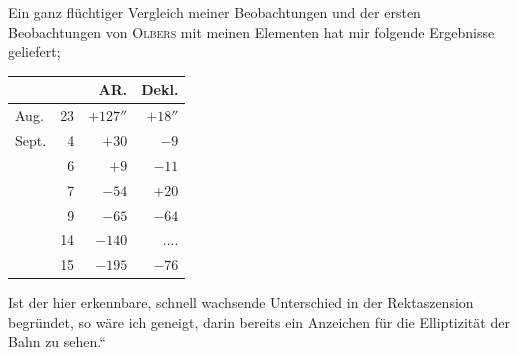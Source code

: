 \par\indent Ein ganz flüchtiger Vergleich meiner Beobachtungen und der ersten Beobachtungen von \textsc{Olbers} mit meinen Elementen hat mir folgende Ergebnisse geliefert;
\begin{center}\fontsize{10}{12}\selectfont\setlength{\tabcolsep}{7pt}\renewcommand{\arraystretch}{1.15}\begin{tabular}{lr|r|r}
 & & AR. & Dekl.\\\hline
Aug. & 23 & $+127''$ & $+18''$\\
Sept. & 4 & $+30$ & $-9$\\
 & 6 & $+9$ & $-11$\\
 & 7 & $-54$ & $+20$\\
 & 9 & $-65$ & $-64$\\
 & 14 & $-140$ & .\;.\;.\;.\\
 & 15 & $-195$ & $-76$\\
\end{tabular}\end{center}

\par\indent Ist der hier erkennbare, schnell wachsende Unterschied in der Rektaszension begründet, so wäre ich geneigt, darin bereits ein Anzeichen für die Elliptizität der Bahn zu sehen.“

